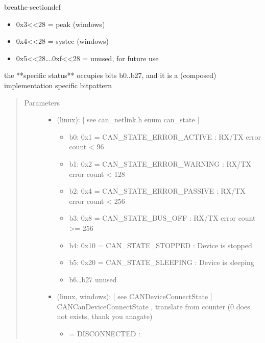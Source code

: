 \documentclass[a4paper,10pt,english]{sphinxmanual}
\begin{document}
\begin{fulllineitems}
\begin{sphinxuseclass}{breathe-sectiondef}
\begin{fulllineitems}
\begin{itemize}
\item {} 
\sphinxAtStartPar
0x3\textless{}\textless{}28 = peak (windows)

\item {} 
\sphinxAtStartPar
0x4\textless{}\textless{}28 = systec (windows)

\item {} 
\sphinxAtStartPar
0x5\textless{}\textless{}28….0xf\textless{}\textless{}28 = unused, for future use

\end{itemize}


\sphinxAtStartPar
the **specific status** occupies bits b0..b27, and it is a (composed) implementation specific bitpattern
\begin{quote}\begin{description}
\item[{Parameters}] \leavevmode\begin{itemize}
\item {} 
\sphinxAtStartPar
{} \textendash{} (linux): {[} see can\_netlink.h enum can\_state {]}\begin{itemize}
\item {} 
\sphinxAtStartPar
b0: 0x1 = CAN\_STATE\_ERROR\_ACTIVE : RX/TX error count \textless{} 96

\item {} 
\sphinxAtStartPar
b1: 0x2 = CAN\_STATE\_ERROR\_WARNING : RX/TX error count \textless{} 128

\item {} 
\sphinxAtStartPar
b2: 0x4 = CAN\_STATE\_ERROR\_PASSIVE : RX/TX error count \textless{} 256

\item {} 
\sphinxAtStartPar
b3: 0x8 = CAN\_STATE\_BUS\_OFF : RX/TX error count \textgreater{}= 256

\item {} 
\sphinxAtStartPar
b4: 0x10 = CAN\_STATE\_STOPPED : Device is stopped

\item {} 
\sphinxAtStartPar
b5: 0x20 = CAN\_STATE\_SLEEPING : Device is sleeping

\item {} 
\sphinxAtStartPar
b6…b27 unused

\end{itemize}


\item {} 
\sphinxAtStartPar
{} \textendash{} (linux, windows): {[} see CANDeviceConnectState {]} CANCanDeviceConnectState , translate from counter (0 does not exists, thank you anagate)\begin{itemize}
\item {} 
 = DISCONNECTED :


\end{itemize}
\end{itemize}
\end{description}
\end{quote}
\end{fulllineitems}
\end{sphinxuseclass}
\end{fulllineitems}
\end{document}
